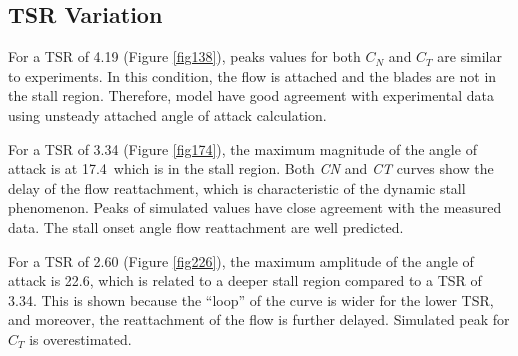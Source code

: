 \documentclass[a4paper]{jpconf}
\begin{document}
\subsection{TSR Variation}

For a TSR of 4.19 (Figure \ref{fig138}), peaks values for both $C_N$ and $C_T$ are similar to experiments. In this condition, the flow is attached and the blades are not in the stall region. Therefore, model have good agreement with experimental data using unsteady attached angle of attack calculation.

For a TSR of 3.34 (Figure \ref{fig174}), the maximum magnitude of the angle of attack is at
17.4\degree\ which is in the stall region. Both \textit{CN} and \textit{CT} curves show the delay
of the flow reattachment, which is characteristic of the dynamic stall
phenomenon. Peaks of simulated values have close agreement with the measured
data. The stall onset angle flow reattachment are well predicted.

For a TSR of 2.60 (Figure \ref{fig226}), the maximum amplitude of the angle of attack is 22.6\degree, which
is related to a deeper stall region compared to a TSR of 3.34. This is shown
because the ``loop'' of the curve is wider for the lower TSR, and moreover, the
reattachment of the flow is further delayed. Simulated peak for $C_T$ is overestimated. 
\end{document}
